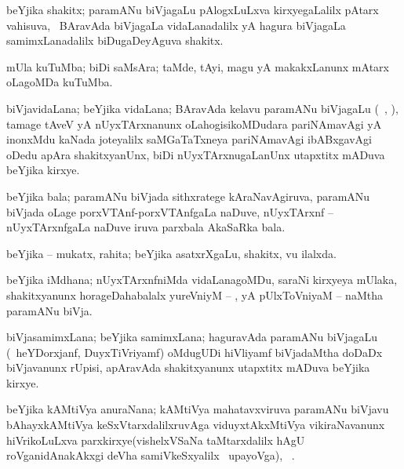 \bentry
{}
\gl{\nA}
\bmng
beYjika shakitx; paramANu biVjagaLu pAlogxLuLxva kirxyegaLalilx pAtarx vahisuva, \kanmu\ BAravAda biVjagaLa vidaLanadalilx yA hagura biVjagaLa samimxLanadalilx biDugaDeyAguva shakitx. 
\emng
\eentry

\bentry
{}
\gl{\nA}
\bmng
mUla kuTuMba; biDi saMsAra; taMde, tAyi, magu yA makakxLanunx mAtarx oLagoMDa kuTuMba. 
\emng
\eentry

\bentry
{}
\gl{\nA}
\bmng
biVjavidaLana; beYjika vidaLana; BAravAda kelavu paramANu biVjagaLu (\kanmu\ , ), tamage tAveV yA nUyxTArxnanunx oLahogisikoMDudara pariNAmavAgi yA inonxMdu kaNada joteyalilx saMGaTaTxneya pariNAmavAgi ibABxgavAgi oDedu apAra shakitxyanUnx, biDi nUyxTArxnugaLanUnx utapxtitx mADuva beYjika kirxye. 
\emng
\eentry

\bentry
{}
\gl{\nA}
\bmng
beYjika bala; paramANu biVjada sithxratege kAraNavAgiruva, paramANu biVjada oLage porxVTAnf-porxVTAnfgaLa naDuve, nUyxTArxnf -- nUyxTArxnfgaLa naDuve iruva parxbala AkaSaRka bala. 
\emng
\eentry

\bentry
{}
\gl{\gu}
\bmng
beYjika -- mukatx, rahita; beYjika asatxrXgaLu, shakitx, \mo vu ilalxda. 
\emng
\eentry

\bentry
{}
\gl{\nA}
\bmng
beYjika iMdhana; nUyxTArxnfniMda vidaLanagoMDu, saraNi kirxyeya mUlaka, shakitxyanunx horageDahabalalx yureVniyM -- , yA pUlxToVniyaM -- naMtha paramANu biVja. 
\emng
\eentry

\bentry
{}
\gl{\nA}
\bmng
biVjasamimxLana; beYjika samimxLana; haguravAda paramANu biVjagaLu (\kanmu\ heYDorxjanf, DuyxTiVriyamf) oMdugUDi hiVliyamf biVjadaMtha doDaDx biVjavanunx rUpisi, apAravAda shakitxyanunx utapxtitx mADuva beYjika kirxye. 
\emng
\eentry

\bentry
{}
\gl{\nA}
\bmng
beYjika kAMtiVya anuraNana; kAMtiVya mahatavxviruva paramANu biVjavu bAhayxkAMtiVya keSxVtarxdalilxruvAga viduyxtAkxMtiVya vikiraNavanunx hiVrikoLuLxva parxkirxye(vishelxVSaNa taMtarxdalilx hAgU roVganidAnakAkxgi deVha samiVkeSxyalilx \kanmu\ upayoVga), \saMkiSx\ . 
\emng
\eentry

